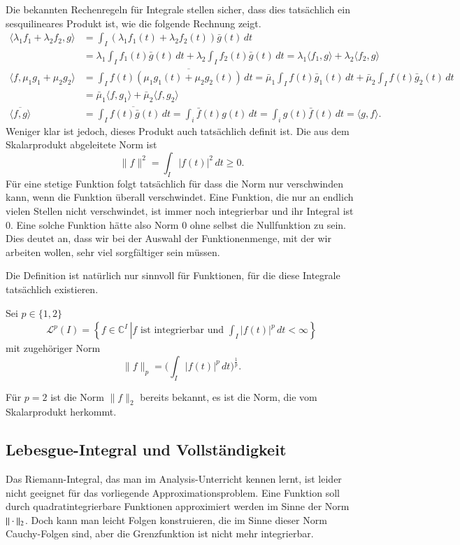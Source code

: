 Die bekannten Rechenregeln für Integrale stellen sicher, dass dies
tatsächlich ein sesquilineares Produkt ist, wie die folgende Rechnung
zeigt.
\begin{align*}
\langle \lambda_1 f_1+\lambda_2 f_2,g\rangle
&=
\int_I (\lambda_1 f_1(t) + \lambda_2 f_2(t))\bar{g}(t)\,dt
\\
&=
\lambda_1 \int_I f_1(t) \bar{g}(t)\,dt + \lambda_2 \int_I f_2(t)\bar{g}(t)\,dt
= \lambda_1 \langle f_1,g\rangle + \lambda_2 \langle f_2,g\rangle
\\
\langle f,\mu_1 g_1 + \mu_2 g_2\rangle
&=
\int_I f(t) \overline{(\mu_1 g_1(t) + \mu_2 g_2(t))}\,dt
=
\bar{\mu}_1 \int_I f(t) \bar{g}_1(t)\,dt
+
\bar{\mu}_2 \int_I f(t) \bar{g}_2(t)\,dt
\\
&=
\bar{\mu}_1 \langle f,g_1\rangle
+
\bar{\mu}_2 \langle f,g_2\rangle
\\
\overline{
\langle f,g\rangle
}
&=
\overline{ \int_I f(t)\bar{g}(t)\,dt}
=
\int_i \bar{f}(t) g(t)\,dt
=
\int_i g(t) \bar{f}(t)\,dt
=
\langle g,f\rangle.
\end{align*}
Weniger klar ist jedoch, dieses Produkt auch tatsächlich definit ist.
Die aus dem Skalarprodukt abgeleitete Norm ist
\[
\|f\|^2 = \int_I |f(t)|^2\,dt \ge 0.
\]
Für eine stetige Funktion folgt tatsächlich für dass die Norm nur
verschwinden kann, wenn die Funktion überall verschwindet.
Eine Funktion, die nur an endlich vielen Stellen nicht verschwindet,
ist immer noch integrierbar und ihr Integral ist $0$.
Eine solche Funktion hätte also Norm $0$ ohne selbst die Nullfunktion zu
sein.
Dies deutet an, dass wir bei der Auswahl der Funktionenmenge, mit der
wir arbeiten wollen, sehr viel sorgfältiger sein müssen.

Die Definition ist natürlich nur sinnvoll für Funktionen, für die diese
Integrale tatsächlich existieren.
\begin{definition}
Sei $p\in \{1,2\}$ 
\begin{align*}
\mathcal{L}^p(I)
=
\left\{ f \in \mathbb C^I \, \left|
\text{
$f$ ist integrierbar und $\int_I |f(t)|^p\,dt<\infty$
}
\right.\right\}
\end{align*}
mit zugehöriger Norm
\[
\|f\|_p = \biggl(\int_I |f(t)|^p \,dt\biggr)^{\frac1p}.
\]
\end{definition}

Für $p=2$ ist die Norm $\|f\|_2$ bereits bekannt, es ist die Norm, die
vom Skalarprodukt herkommt.

\subsection{Lebesgue-Integral und Vollständigkeit}
Das Riemann-Integral, das man im Analysis-Unterricht kennen lernt, 
ist leider nicht geeignet für das vorliegende Approximationsproblem.
Eine Funktion soll durch quadratintegrierbare Funktionen approximiert
werden im Sinne der Norm $\|\mathstrut\cdot\mathstrut\|_2$.
Doch kann man leicht Folgen konstruieren, die im Sinne dieser Norm
Cauchy-Folgen sind, aber die Grenzfunktion ist nicht mehr integrierbar.


